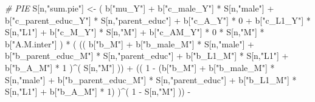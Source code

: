 \documentclass[
]{book}
\newenvironment{Shaded}{\begin{snugshade}}{\end{snugshade}}
\newcommand{\CommentTok}[1]{\textcolor[rgb]{0.56,0.35,0.01}{\textit{#1}}}
\newcommand{\DecValTok}[1]{\textcolor[rgb]{0.00,0.00,0.81}{#1}}
\newcommand{\NormalTok}[1]{#1}
\newcommand{\OtherTok}[1]{\textcolor[rgb]{0.56,0.35,0.01}{#1}}
\newcommand{\SpecialCharTok}[1]{\textcolor[rgb]{0.00,0.00,0.00}{#1}}
\newcommand{\StringTok}[1]{\textcolor[rgb]{0.31,0.60,0.02}{#1}}
\begin{document}
\begin{Shaded}
\begin{Highlighting}[]
    \CommentTok{\# PIE }
\NormalTok{    S[n,}\StringTok{"sum.pie"}\NormalTok{] }\OtherTok{\textless{}{-}}\NormalTok{ ( b[}\StringTok{"mu\_Y"}\NormalTok{] }\SpecialCharTok{+} 
\NormalTok{                          b[}\StringTok{"c\_male\_Y"}\NormalTok{] }\SpecialCharTok{*}\NormalTok{ S[n,}\StringTok{"male"}\NormalTok{] }\SpecialCharTok{+} 
\NormalTok{                          b[}\StringTok{"c\_parent\_educ\_Y"}\NormalTok{] }\SpecialCharTok{*}\NormalTok{ S[n,}\StringTok{"parent\_educ"}\NormalTok{] }\SpecialCharTok{+} 
\NormalTok{                          b[}\StringTok{"c\_A\_Y"}\NormalTok{] }\SpecialCharTok{*} \DecValTok{0} \SpecialCharTok{+} 
\NormalTok{                          b[}\StringTok{"c\_L1\_Y"}\NormalTok{] }\SpecialCharTok{*}\NormalTok{ S[n,}\StringTok{"L1"}\NormalTok{] }\SpecialCharTok{+}
\NormalTok{                          b[}\StringTok{"c\_M\_Y"}\NormalTok{] }\SpecialCharTok{*}\NormalTok{ S[n,}\StringTok{"M"}\NormalTok{] }\SpecialCharTok{+}
\NormalTok{                          b[}\StringTok{"c\_AM\_Y"}\NormalTok{] }\SpecialCharTok{*} \DecValTok{0} \SpecialCharTok{*}\NormalTok{ S[n,}\StringTok{"M"}\NormalTok{] }\SpecialCharTok{*}\NormalTok{ b[}\StringTok{"A.M.inter"}\NormalTok{] ) }\SpecialCharTok{*}
\NormalTok{      ( (( b[}\StringTok{"b\_M"}\NormalTok{] }\SpecialCharTok{+} 
\NormalTok{             b[}\StringTok{"b\_male\_M"}\NormalTok{] }\SpecialCharTok{*}\NormalTok{ S[n,}\StringTok{"male"}\NormalTok{] }\SpecialCharTok{+} 
\NormalTok{             b[}\StringTok{"b\_parent\_educ\_M"}\NormalTok{] }\SpecialCharTok{*}\NormalTok{ S[n,}\StringTok{"parent\_educ"}\NormalTok{] }\SpecialCharTok{+} 
\NormalTok{             b[}\StringTok{"b\_L1\_M"}\NormalTok{] }\SpecialCharTok{*}\NormalTok{ S[n,}\StringTok{"L1"}\NormalTok{] }\SpecialCharTok{+}
\NormalTok{             b[}\StringTok{"b\_A\_M"}\NormalTok{] }\SpecialCharTok{*} \DecValTok{1}\NormalTok{ )}\SpecialCharTok{\^{}}\NormalTok{( S[n,}\StringTok{"M"}\NormalTok{] )) }\SpecialCharTok{+}
\NormalTok{          (( }\DecValTok{1} \SpecialCharTok{{-}}\NormalTok{ (b[}\StringTok{"b\_M"}\NormalTok{] }\SpecialCharTok{+} 
\NormalTok{                    b[}\StringTok{"b\_male\_M"}\NormalTok{] }\SpecialCharTok{*}\NormalTok{ S[n,}\StringTok{"male"}\NormalTok{] }\SpecialCharTok{+} 
\NormalTok{                    b[}\StringTok{"b\_parent\_educ\_M"}\NormalTok{] }\SpecialCharTok{*}\NormalTok{ S[n,}\StringTok{"parent\_educ"}\NormalTok{] }\SpecialCharTok{+} 
\NormalTok{                    b[}\StringTok{"b\_L1\_M"}\NormalTok{] }\SpecialCharTok{*}\NormalTok{ S[n,}\StringTok{"L1"}\NormalTok{] }\SpecialCharTok{+}
\NormalTok{                    b[}\StringTok{"b\_A\_M"}\NormalTok{] }\SpecialCharTok{*} \DecValTok{1}\NormalTok{) )}\SpecialCharTok{\^{}}\NormalTok{( }\DecValTok{1} \SpecialCharTok{{-}}\NormalTok{ S[n,}\StringTok{"M"}\NormalTok{] )) }\SpecialCharTok{{-}}

\end{Highlighting}
\end{Shaded}
\end{document}
